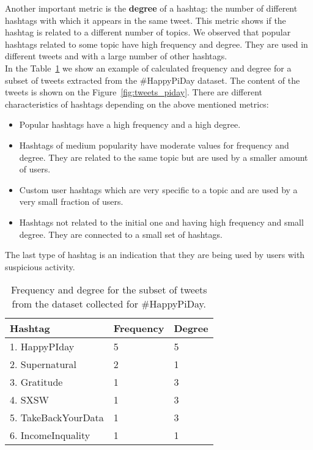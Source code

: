 \documentclass[journal, a4paper, 12pt]{article}
\begin{document}
Another important metric is the \textbf{degree} of a hashtag: the number of different hashtags with which it appears in the same tweet. This metric shows if the hashtag is related to a different number of topics. We observed that popular hashtags related to some topic have high frequency and degree. They are used in different tweets and with a large number of other hashtags. \\

In the Table~\ref{tab:graph_freq_degree} we show an example of calculated frequency and degree for a subset of tweets extracted from the \#HappyPiDay dataset. The content of the tweets is shown on the Figure~\ref{fig:tweets_piday}. There are different characteristics of hashtags depending on the above mentioned metrics:

\begin{itemize}

\item Popular hashtags have a high frequency and a high degree.

\item Hashtags of medium popularity have moderate values for frequency and degree. They are related to the same topic but are used by a smaller amount of users.

\item Custom user hashtags which are very specific to a topic and are used by a very small fraction of users.

\item Hashtags not related to the initial one and having high frequency and small degree. They are connected to a small set of hashtags.
\end{itemize}

The last type of hashtag is an indication that they are being used by users with suspicious activity. \\

      \begin{table}[!hbt]
            \begin{center}
            \caption{Frequency and degree for the subset of tweets from the dataset collected for \#HappyPiDay.}
            \label{tab:graph_freq_degree}
            \begin{tabular}{|p{4cm}|p{2cm}|p{2cm}|}
                  \hline
                  Hashtag & Frequency & Degree \\
            \hline
                  1. HappyPIday & 5 & 5 \\
                  \hline
                  2. Supernatural & 2  &  1  \\
                  \hline
                  3. Gratitude & 1 & 3 \\
            \hline
            4. SXSW & 1 & 3 \\
                  \hline
            5. TakeBackYourData & 1 & 3\\
                  \hline
            6. IncomeInquality & 1 & 1 \\
                  \hline
            \end{tabular}
            \end{center}
      \end{table}
\end{document}
